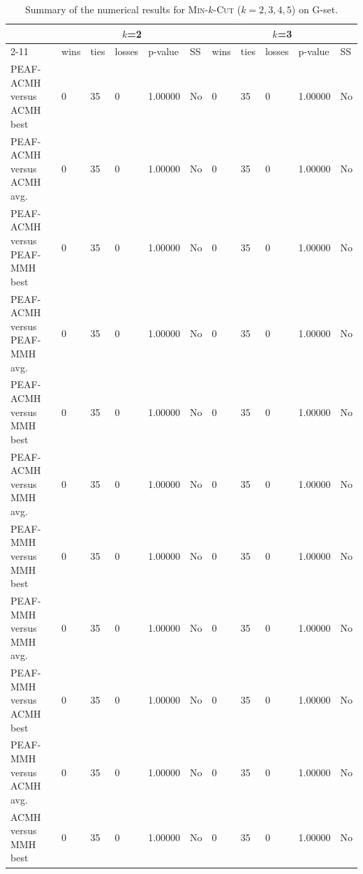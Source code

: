 \documentclass[12pt, a4paper]{article}%
\renewcommand{\arraystretch}{1.3}
\numberwithin{equation}{section}
\theoremstyle{plain}
\begin{document}
			
			
			{
				\scriptsize
				\setlength{\tabcolsep}{10pt}
				\renewcommand{\arraystretch}{1.6}
				\begin{landscape}
					\begin{longtable}{|l|lllll|lllll|}
						\caption[Summary for \textsc{Min}-$k$-\textsc{Cut}]{Summary of the numerical results for \textsc{Min}-$k$-\textsc{Cut} ($k=2,3,4,5$) on G-set.}
						\label{tab::mincut-summary}\\
						\hline
						\multicolumn{1}{|c|}{\multirow{2}{*}{}} & \multicolumn{5}{c|}{$k$=2}          & \multicolumn{5}{c|}{$k$=3}          \\ \cline{2-11} 
						\multicolumn{1}{|c|}{}                  & wins & ties & losses & p-value & SS & wins & ties & losses & p-value & SS \\ \hline
						PEAF-ACMH versus ACMH best             & 0    & 35   & 0      & 1.00000 & No & 0    & 35   & 0      & 1.00000 & No \\
						PEAF-ACMH versus ACMH avg.             & 0    & 35   & 0      & 1.00000 & No & 0    & 35   & 0      & 1.00000 & No \\
						PEAF-ACMH versus PEAF-MMH best           & 0    & 35   & 0      & 1.00000 & No & 0    & 35   & 0      & 1.00000 & No \\
						PEAF-ACMH versus PEAF-MMH avg.           & 0    & 35   & 0      & 1.00000 & No & 0    & 35   & 0      & 1.00000 & No \\
						PEAF-ACMH versus MMH best               & 0    & 35   & 0      & 1.00000 & No & 0    & 35   & 0      & 1.00000 & No \\
						PEAF-ACMH versus MMH avg.               & 0    & 35   & 0      & 1.00000 & No & 0    & 35   & 0      & 1.00000 & No \\
						PEAF-MMH versus MMH best                 & 0    & 35   & 0      & 1.00000 & No & 0    & 35   & 0      & 1.00000 & No \\
						PEAF-MMH versus MMH avg.                 & 0    & 35   & 0      & 1.00000 & No & 0    & 35   & 0      & 1.00000 & No \\
						PEAF-MMH versus ACMH best               & 0    & 35   & 0      & 1.00000 & No & 0    & 35   & 0      & 1.00000 & No \\
						PEAF-MMH versus ACMH avg.               & 0    & 35   & 0      & 1.00000 & No & 0    & 35   & 0      & 1.00000 & No \\
						ACMH versus MMH best                   & 0    & 35   & 0      & 1.00000 & No & 0    & 35   & 0      & 1.00000 & No \\

\end{longtable}
\end{landscape}}
\end{document}
